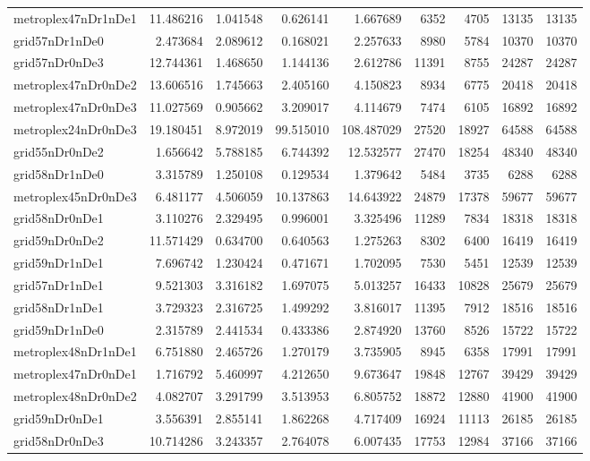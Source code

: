 \begin{longtable}{|l|r|r|r|r|r|r|r|r|}
metroplex47nDr1nDe1 & 11.486216 & 1.041548 & 0.626141 & 1.667689 & 6352 & 4705 & 13135 & 13135 \\
grid57nDr1nDe0 & 2.473684 & 2.089612 & 0.168021 & 2.257633 & 8980 & 5784 & 10370 & 10370 \\
grid57nDr0nDe3 & 12.744361 & 1.468650 & 1.144136 & 2.612786 & 11391 & 8755 & 24287 & 24287 \\
metroplex47nDr0nDe2 & 13.606516 & 1.745663 & 2.405160 & 4.150823 & 8934 & 6775 & 20418 & 20418 \\
metroplex47nDr0nDe3 & 11.027569 & 0.905662 & 3.209017 & 4.114679 & 7474 & 6105 & 16892 & 16892 \\
metroplex24nDr0nDe3 & 19.180451 & 8.972019 & 99.515010 & 108.487029 & 27520 & 18927 & 64588 & 64588 \\
grid55nDr0nDe2 & 1.656642 & 5.788185 & 6.744392 & 12.532577 & 27470 & 18254 & 48340 & 48340 \\
grid58nDr1nDe0 & 3.315789 & 1.250108 & 0.129534 & 1.379642 & 5484 & 3735 & 6288 & 6288 \\
metroplex45nDr0nDe3 & 6.481177 & 4.506059 & 10.137863 & 14.643922 & 24879 & 17378 & 59677 & 59677 \\
grid58nDr0nDe1 & 3.110276 & 2.329495 & 0.996001 & 3.325496 & 11289 & 7834 & 18318 & 18318 \\
grid59nDr0nDe2 & 11.571429 & 0.634700 & 0.640563 & 1.275263 & 8302 & 6400 & 16419 & 16419 \\
grid59nDr1nDe1 & 7.696742 & 1.230424 & 0.471671 & 1.702095 & 7530 & 5451 & 12539 & 12539 \\
grid57nDr1nDe1 & 9.521303 & 3.316182 & 1.697075 & 5.013257 & 16433 & 10828 & 25679 & 25679 \\
grid58nDr1nDe1 & 3.729323 & 2.316725 & 1.499292 & 3.816017 & 11395 & 7912 & 18516 & 18516 \\
grid59nDr1nDe0 & 2.315789 & 2.441534 & 0.433386 & 2.874920 & 13760 & 8526 & 15722 & 15722 \\
metroplex48nDr1nDe1 & 6.751880 & 2.465726 & 1.270179 & 3.735905 & 8945 & 6358 & 17991 & 17991 \\
metroplex47nDr0nDe1 & 1.716792 & 5.460997 & 4.212650 & 9.673647 & 19848 & 12767 & 39429 & 39429 \\
metroplex48nDr0nDe2 & 4.082707 & 3.291799 & 3.513953 & 6.805752 & 18872 & 12880 & 41900 & 41900 \\
grid59nDr0nDe1 & 3.556391 & 2.855141 & 1.862268 & 4.717409 & 16924 & 11113 & 26185 & 26185 \\
grid58nDr0nDe3 & 10.714286 & 3.243357 & 2.764078 & 6.007435 & 17753 & 12984 & 37166 & 37166 \\

\end{longtable}
